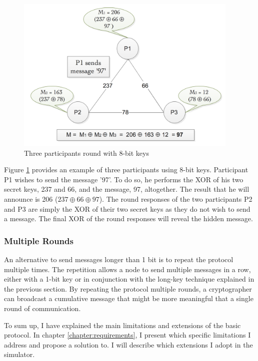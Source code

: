 \begin{figure}[H]
    \centering
    \includegraphics[width=0.95\textwidth]{Images/dcnet8bitkeys.png}
    \caption{Three participants round with 8-bit keys}
    \label{fig:xorlongkeys}
\end{figure}

Figure \ref{fig:xorlongkeys} provides an example of three participants using 8-bit keys. Participant P1 wishes to send the message '97'. To do so, he performs the XOR of his two secret keys, 237 and 66, and the message, 97, altogether. The result that he will announce is 206 ($237 \oplus 66 \oplus 97$). The round responses of the two participants P2 and P3 are simply the XOR of their two secret keys as they do not wish to send a message. The final XOR of the round responses will reveal the hidden message.


\subsubsection{Multiple Rounds} \label{sec:messageExtentionRounds}
An alternative to send messages longer than 1 bit is to repeat the protocol multiple times. The repetition allows a node to send multiple messages in a row, either with a 1-bit key or in conjunction with the long-key technique explained in the previous section. By repeating the protocol multiple rounds, a cryptographer can broadcast a cumulative message that might be more meaningful that a single round of communication. \newline

To sum up, I have explained the main limitations and extensions of the basic protocol. In chapter \ref{chapter:requirements}, I present which specific limitations I address and propose a solution to. I will describe which extensions I adopt in the simulator.

